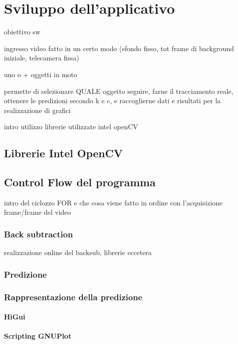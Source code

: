 
\chapter{Sviluppo dell'applicativo}
obiettivo sw

ingresso video fatto in un certo modo (sfondo fisso, tot frame di background iniziale, telecamera fissa)

uno o + oggetti in moto

permette di selezionare QUALE oggetto seguire, farne il tracciamento reale, ottenere le predizioni secondo k e c, e raccoglierne dati e risultati per la realizzazione di grafici

intro utilizzo librerie utilizzate intel openCV
\section{Librerie Intel OpenCV}

\section{Control Flow del programma}
intro del ciclozzo FOR e che cosa viene fatto in ordine con l'acquisizione frame/frame del video

\subsection{Back subtraction}
realizzazione online del backsub, librerie eccetera
\subsection{Predizione}
\subsection{Rappresentazione della predizione}
\subsubsection{HiGui}
\subsubsection{Scripting GNUPlot}

